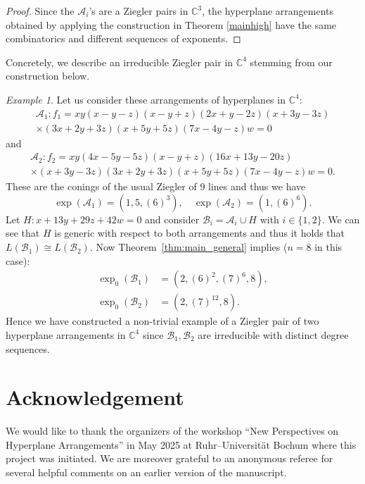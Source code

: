 \documentclass[a4paper,11pt]{amsart}
\def\CC{{\mathbb{C}}}%
\def\C{{\mathbb{C}}}%
\def\A{{\mathcal{A}}}%
\def\C{{\mathcal{C}}}%
\numberwithin{equation}{section}
\theoremstyle{remark}
\newtheorem{example}[theorem]{Example}
\begin{document}
\begin{proof}
	Since the $\A_i$'s are a Ziegler pairs in $\CC^3$, the hyperplane arrangements obtained by applying the construction in Theorem \ref{mainhigh} have the same combinatorics and different sequences of exponents.
\end{proof}

Concretely, we describe an irreducible Ziegler pair in $\CC^4$ stemming from our construction below.

\begin{example}
	Let us consider these arrangements of hyperplanes in $\mathbb{C}^{4}$:
	\begin{multline*}
		\mathcal{A}_{1} : f_{1} = xy(x-y-z)(x-y+z)(2x+y-2z)(x+3y-3z) \\ \times  (3x+2y+3z)(x+5y+5z)(7x-4y-z)w =0   
	\end{multline*}
	and 
	\begin{multline*}
		\mathcal{A}_{2} : f_{2} = xy(4x-5y-5z)(x-y+z)(16x+13y-20z) \\ \times (x+3y-3z)(3x+2y+3z)(x+5y+5z)(7x-4y-z)w =0.
	\end{multline*}
	These are the conings of the usual Ziegler of $9$ lines and thus we have
	\[
		\exp(\A_1) = (1,5,(6)^3), \quad \exp(\A_2) = (1,(6)^6).
	\]
	Let $H : x+13y+29z+42w = 0$ and consider $\mathcal{B}_{i} = \mathcal{A}_{i} \cup H$ with $i \in \{1,2\}$. We can see that $H$ is generic with respect to both arrangements and thus it holds that $L(\mathcal{B}_{1}) \cong L(\mathcal{B}_{2})$.
	Now Theorem~\ref{thm:main_general} implies ($n=8$ in this case):
	\begin{align*}
	\exp_{0}(\mathcal{B}_{1}) &= (2,(6)^2,(7)^6,8), \\
	\exp_{0}(\mathcal{B}_{2}) &= (2,(7)^{12},8).
	\end{align*}
	Hence we have constructed a non-trivial example of a Ziegler pair of two hyperplane arrangements in $\mathbb{C}^{4}$ since $\mathcal{B}_{1}, \mathcal{B}_{2}$ are irreducible with distinct degree sequences.
\end{example}

\section*{Acknowledgement}
We would like to thank the organizers of the workshop ``New Perspectives on Hyperplane Arrangements'' in May 2025 at Ruhr--Universität Bochum where this project was initiated.
We are moreover grateful to an anonymous referee for several helpful comments on an earlier version of the manuscript.
\end{document}
